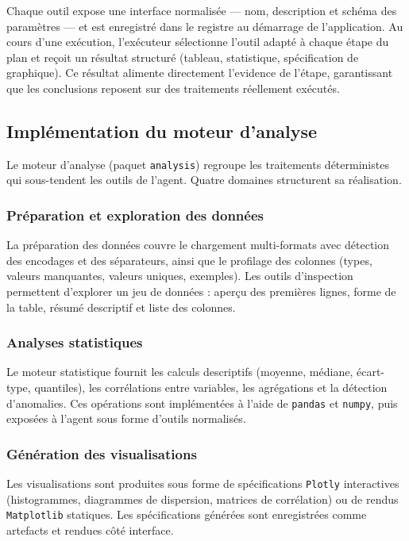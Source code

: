 Chaque outil expose une interface normalisée — nom, description et schéma des paramètres — et est enregistré dans le registre au démarrage de l'application. Au cours d'une exécution, l'exécuteur sélectionne l'outil adapté à chaque étape du plan et reçoit un résultat structuré (tableau, statistique, spécification de graphique). Ce résultat alimente directement l'evidence de l'étape, garantissant que les conclusions reposent sur des traitements réellement exécutés.

\subsection{Implémentation du moteur d'analyse}

Le moteur d'analyse (paquet \texttt{analysis}) regroupe les traitements déterministes qui sous-tendent les outils de l'agent. Quatre domaines structurent sa réalisation.

\subsubsection{Préparation et exploration des données}

La préparation des données couvre le chargement multi-formats avec détection des encodages et des séparateurs, ainsi que le profilage des colonnes (types, valeurs manquantes, valeurs uniques, exemples). Les outils d'inspection permettent d'explorer un jeu de données : aperçu des premières lignes, forme de la table, résumé descriptif et liste des colonnes.

\subsubsection{Analyses statistiques}

Le moteur statistique fournit les calculs descriptifs (moyenne, médiane, écart-type, quantiles), les corrélations entre variables, les agrégations et la détection d'anomalies. Ces opérations sont implémentées à l'aide de \texttt{pandas} et \texttt{numpy}, puis exposées à l'agent sous forme d'outils normalisés.

\subsubsection{Génération des visualisations}

Les visualisations sont produites sous forme de spécifications \texttt{Plotly} interactives (histogrammes, diagrammes de dispersion, matrices de corrélation) ou de rendus \texttt{Matplotlib} statiques. Les spécifications générées sont enregistrées comme artefacts et rendues côté interface.

